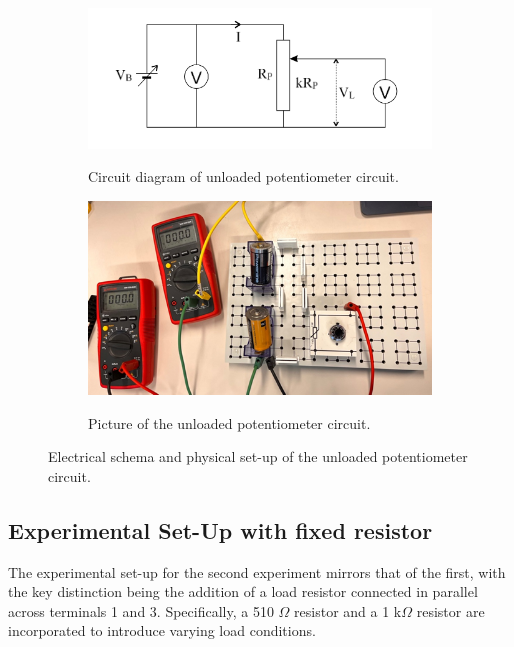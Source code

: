 \documentclass[a4paper]{article}
\begin{document}
\begin{figure}[!h]
    \centering
    \begin{subfigure}{.5\textwidth}
        \centering
        \includegraphics[width=0.8\linewidth]{Unloaded pot circuit.png}
        \label{fig:2a}
        \caption{Circuit diagram of unloaded potentiometer circuit\cite{report}.}   
    \end{subfigure}%
    \begin{subfigure}{.5\textwidth}
        \centering
        \includegraphics[width = 0.8\linewidth]{unloaded pot picture.png}
        \label{fig2:b}
        \caption{Picture of the unloaded potentiometer circuit.}
    \end{subfigure}
    \caption{Electrical schema and physical set-up of the unloaded potentiometer circuit.}
\end{figure}
\subsection{Experimental Set-Up with fixed resistor}
The experimental set-up for the second experiment mirrors that of the first, 
with the key distinction being the addition of a load resistor connected in parallel across terminals 1 and 3.
Specifically, a 510 $\Omega$ resistor and a 1 k$\Omega$ resistor are incorporated to introduce varying load conditions.
\end{document}
